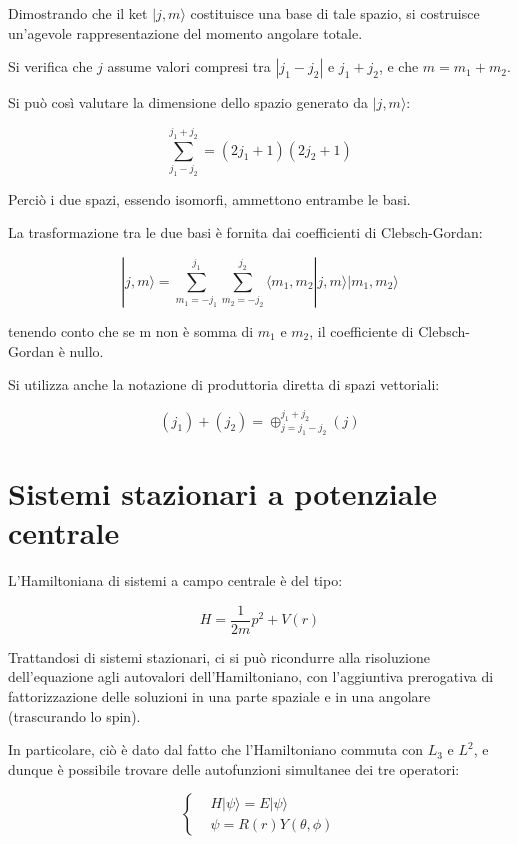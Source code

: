 \documentclass{report}
\begin{document}
Dimostrando che il ket $|j,m\rangle $ costituisce una base di tale spazio, si costruisce un'agevole rappresentazione del momento angolare totale.

Si verifica che $j$ assume valori compresi tra $|j_1-j_2|$ e $j_1+j_2$, e che $m=m_1+m_2$.

Si può così valutare la dimensione dello spazio generato da $|j,m\rangle $:

\begin{equation}
  \sum_{j_1-j_2}^{j_1+j_2}=(2j_1+1)(2j_2+1)
\end{equation}

Perciò i due spazi, essendo isomorfi, ammettono entrambe le basi.

La trasformazione tra le due basi è fornita dai coefficienti di Clebsch-Gordan:

\begin{equation}
  |j,m\rangle =\sum_{m_1=-j_1}^{j_1} \sum_{m_2=-j_2}^{j_2}\langle m_1,m_2|j,m\rangle |m_1,m_2\rangle
\end{equation}

tenendo conto che se m non è somma di $m_1$ e $m_2$, il coefficiente di Clebsch-Gordan è nullo.

Si utilizza anche la notazione di produttoria diretta di spazi vettoriali:

\begin{equation}
  (j_1)+(j_2)= \oplus_{j=j_1-j_2}^{j_1+j_2} (j)
\end{equation}

\section{Sistemi stazionari a potenziale centrale}
L'Hamiltoniana di sistemi a campo centrale è del tipo:

\begin{equation}
  H=\frac{1}{2m}p^2+V(r)
\end{equation}

Trattandosi di sistemi stazionari, ci si può ricondurre alla risoluzione dell'equazione agli autovalori dell'Hamiltoniano,
con l'aggiuntiva prerogativa di fattorizzazione delle soluzioni in una parte spaziale e in una angolare (trascurando lo spin).

In particolare, ciò è dato dal fatto che l'Hamiltoniano commuta con $L_3$ e $L^2$, e dunque è possibile trovare delle autofunzioni simultanee dei tre operatori:

\begin{equation}
  \left\{
  \begin{aligned}
     & H|\psi\rangle =E|\psi\rangle \\
     & \psi= R(r)Y(\theta, \phi)
  \end{aligned}
  \right.
\end{equation}
\end{document}
